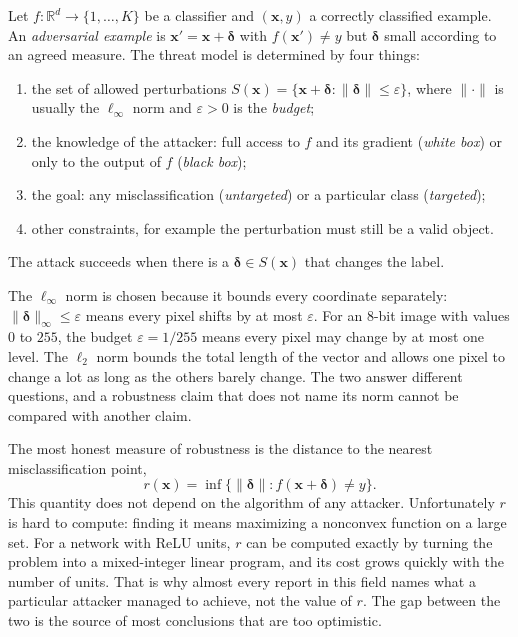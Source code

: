 \begin{definisi}
Let $f:\mathbb{R}^{d}\to\{1,\dots,K\}$ be a classifier and
$(\mathbf{x},y)$ a correctly classified example. An
\emph{adversarial example} is $\mathbf{x}'=\mathbf{x}+\boldsymbol{\delta}$ with
$f(\mathbf{x}')\neq y$ but $\boldsymbol{\delta}$ small according to an agreed
measure. The threat model is determined by four things:
\begin{enumerate}
  \item the set of allowed perturbations
        $S(\mathbf{x})=\{\mathbf{x}+\boldsymbol{\delta}:
        \lVert\boldsymbol{\delta}\rVert\le\varepsilon\}$, where
        $\lVert\cdot\rVert$ is usually the $\ell_\infty$ norm and $\varepsilon>0$
        is the \emph{budget};
  \item the knowledge of the attacker: full access to $f$ and its gradient
        (\emph{white box}) or only to the output of $f$ (\emph{black box});
  \item the goal: any misclassification (\emph{untargeted}) or a particular
        class (\emph{targeted});
  \item other constraints, for example the perturbation must still be a valid
        object.
\end{enumerate}
The attack succeeds when there is a $\boldsymbol{\delta}\in S(\mathbf{x})$ that
changes the label.
\end{definisi}

The $\ell_\infty$ norm is chosen because it bounds every coordinate separately:
$\lVert\boldsymbol{\delta}\rVert_\infty\le\varepsilon$ means every pixel shifts by
at most $\varepsilon$. For an 8-bit image with values $0$ to $255$, the budget
$\varepsilon=1/255$ means every pixel may change by at most one level.
The $\ell_2$ norm bounds the total length of the vector and allows one pixel to
change a lot as long as the others barely change. The two answer different
questions, and a robustness claim that does not name its norm cannot be compared
with another claim.

The most honest measure of robustness is the distance to the nearest
misclassification point,
\[
  r(\mathbf{x})=\inf\{\lVert\boldsymbol{\delta}\rVert:
  f(\mathbf{x}+\boldsymbol{\delta})\neq y\}.
\]
This quantity does not depend on the algorithm of any attacker. Unfortunately $r$
is hard to compute: finding it means maximizing a nonconvex function on a large
set. For a network with ReLU units, $r$ can be computed exactly by turning the
problem into a mixed-integer linear program, and its cost grows quickly with the
number of units. That is why almost every report in this field names what a
particular attacker managed to achieve, not the value of $r$. The gap between the
two is the source of most conclusions that are too optimistic.

